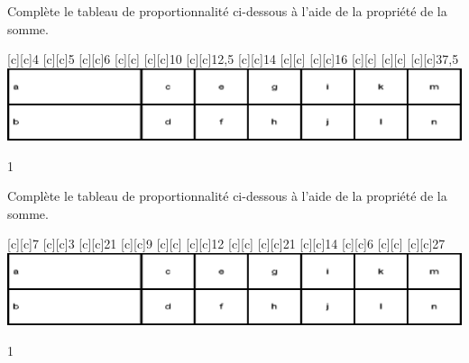 \documentclass[a4paper,11pt]{report}
\begin{document}
\begin{exop}{
Complète le tableau de proportionnalité ci-dessous à l'aide de la propriété de la somme.
\begin{center}
[c][c]{4}
[c][c]{5}
[c][c]{6}
[c][c]{}
[c][c]{10}
[c][c]{12,5}
[c][c]{14}
[c][c]{}
[c][c]{16}
[c][c]{}
[c][c]{}
[c][c]{37,5}
\includegraphics[scale=.9]{media/fa-30/tableaut.eps}
\end{center}
\vspace{-0.5cm}}{1}
\end{exop}

\begin{exop}{
Complète le tableau de proportionnalité ci-dessous à l'aide de la propriété de la somme.
\begin{center}
[c][c]{7}
[c][c]{3}
[c][c]{21}
[c][c]{9}
[c][c]{}
[c][c]{12}
[c][c]{}
[c][c]{21}
[c][c]{14}
[c][c]{6}
[c][c]{}
[c][c]{27}
\includegraphics[scale=.9]{media/fa-30/tableaut.eps}
\end{center}
\vspace{-0.5cm}}{1}
\end{exop}
\end{document}
